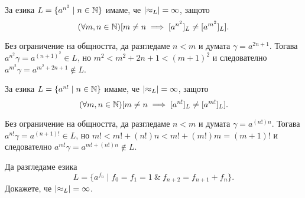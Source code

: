 \begin{example}
  За езика $L = \{a^{n^2} \mid n \in \mathbb{N}\}$ имаме, че $\lvert{\approx_L}\rvert = \infty$,
  защото \[(\forall m,n\in\mathbb{N})[m \neq n \implies [a^{n^2}]_L \neq [a^{m^2}]_L].\]
  
  Без ограничение на общността, да разгледаме $n < m$ и думата $\gamma = a^{2n+1}$.
  Тогава $a^{n^2}\gamma = a^{(n+1)^2} \in L$, но 
  $m^2 < m^2 + 2n + 1 < (m+1)^2$ и следователно $a^{m^2}\gamma = a^{m^2+2n+1}\not\in L$.
\end{example}

\begin{example}
  За езика $L = \{a^{n!} \mid n \in \mathbb{N}\}$ имаме, че $\lvert{\approx_L}\rvert = \infty$,
  защото \[(\forall m,n\in\mathbb{N})[m \neq n \implies [a^{n!}]_L \neq [a^{m!}]_L].\]
  
  Без ограничение на общността, да разгледаме $n < m$ и думата $\gamma = a^{(n!)n}$.
  Тогава $a^{n!}\gamma = a^{(n+1)!} \in L$, но 
  $m! < m! + (n!)n < m! + (m!)m = (m+1)!$ и следователно $a^{m!}\gamma = a^{m!+(n!)n}\not\in L$.
\end{example}

\begin{problem}
  Да разгледаме езика
  \[L = \{a^{f_n} \mid f_0 = f_1 = 1\ \&\ f_{n+2} = f_{n+1} + f_{n}\}.\]
  Докажете, че $\lvert{\approx_L}\rvert = \infty$.
\end{problem}


